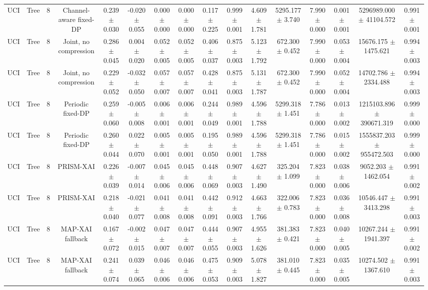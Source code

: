 \begin{tabular}{lccccccccccccccc}
UCI & Tree & 8 & Channel-aware fixed-DP & 0.239 $\pm$ 0.030 & -0.020 $\pm$ 0.055 & 0.000 $\pm$ 0.000 & 0.000 $\pm$ 0.000 & 0.117 $\pm$ 0.225 & 0.999 $\pm$ 0.001 & 4.609 $\pm$ 1.781 & 5295.177 $\pm$ 3.740 & 7.990 $\pm$ 0.000 & 0.001 $\pm$ 0.001 & 5296989.000 $\pm$ 41104.572 & 0.991 $\pm$ 0.001 \\
UCI & Tree & 8 & Joint, no compression & 0.286 $\pm$ 0.045 & 0.004 $\pm$ 0.020 & 0.052 $\pm$ 0.005 & 0.052 $\pm$ 0.005 & 0.406 $\pm$ 0.037 & 0.875 $\pm$ 0.003 & 5.123 $\pm$ 1.792 & 672.300 $\pm$ 0.452 & 7.990 $\pm$ 0.000 & 0.053 $\pm$ 0.004 & 15676.175 $\pm$ 1475.621 & 0.994 $\pm$ 0.003 \\
UCI & Tree & 8 & Joint, no compression & 0.229 $\pm$ 0.052 & -0.032 $\pm$ 0.050 & 0.057 $\pm$ 0.007 & 0.057 $\pm$ 0.007 & 0.428 $\pm$ 0.041 & 0.875 $\pm$ 0.003 & 5.131 $\pm$ 1.787 & 672.300 $\pm$ 0.452 & 7.990 $\pm$ 0.000 & 0.052 $\pm$ 0.004 & 14702.786 $\pm$ 2334.488 & 0.994 $\pm$ 0.003 \\
UCI & Tree & 8 & Periodic fixed-DP & 0.259 $\pm$ 0.060 & -0.005 $\pm$ 0.008 & 0.006 $\pm$ 0.001 & 0.006 $\pm$ 0.001 & 0.244 $\pm$ 0.049 & 0.989 $\pm$ 0.001 & 4.596 $\pm$ 1.788 & 5299.318 $\pm$ 1.451 & 7.786 $\pm$ 0.000 & 0.013 $\pm$ 0.002 & 1215103.896 $\pm$ 390671.319 & 0.999 $\pm$ 0.000 \\
UCI & Tree & 8 & Periodic fixed-DP & 0.260 $\pm$ 0.044 & 0.022 $\pm$ 0.070 & 0.005 $\pm$ 0.001 & 0.005 $\pm$ 0.001 & 0.195 $\pm$ 0.050 & 0.989 $\pm$ 0.001 & 4.596 $\pm$ 1.788 & 5299.318 $\pm$ 1.451 & 7.786 $\pm$ 0.000 & 0.015 $\pm$ 0.002 & 1555837.203 $\pm$ 955472.503 & 0.999 $\pm$ 0.000 \\
UCI & Tree & 8 & PRISM-XAI & 0.226 $\pm$ 0.039 & -0.007 $\pm$ 0.014 & 0.045 $\pm$ 0.006 & 0.045 $\pm$ 0.006 & 0.448 $\pm$ 0.069 & 0.907 $\pm$ 0.003 & 4.627 $\pm$ 1.490 & 325.204 $\pm$ 1.099 & 7.823 $\pm$ 0.000 & 0.038 $\pm$ 0.006 & 9052.203 $\pm$ 1462.054 & 0.991 $\pm$ 0.002 \\
UCI & Tree & 8 & PRISM-XAI & 0.218 $\pm$ 0.040 & -0.021 $\pm$ 0.077 & 0.041 $\pm$ 0.008 & 0.041 $\pm$ 0.008 & 0.442 $\pm$ 0.091 & 0.912 $\pm$ 0.003 & 4.663 $\pm$ 1.766 & 322.006 $\pm$ 0.783 & 7.823 $\pm$ 0.000 & 0.036 $\pm$ 0.008 & 10546.447 $\pm$ 3413.298 & 0.991 $\pm$ 0.003 \\
UCI & Tree & 8 & MAP-XAI fallback & 0.167 $\pm$ 0.072 & -0.002 $\pm$ 0.015 & 0.047 $\pm$ 0.007 & 0.047 $\pm$ 0.007 & 0.444 $\pm$ 0.055 & 0.907 $\pm$ 0.003 & 4.955 $\pm$ 1.626 & 381.383 $\pm$ 0.421 & 7.823 $\pm$ 0.000 & 0.040 $\pm$ 0.005 & 10267.244 $\pm$ 1941.397 & 0.991 $\pm$ 0.002 \\
UCI & Tree & 8 & MAP-XAI fallback & 0.241 $\pm$ 0.074 & 0.039 $\pm$ 0.065 & 0.046 $\pm$ 0.006 & 0.046 $\pm$ 0.006 & 0.475 $\pm$ 0.053 & 0.909 $\pm$ 0.003 & 5.078 $\pm$ 1.827 & 381.010 $\pm$ 0.445 & 7.823 $\pm$ 0.000 & 0.035 $\pm$ 0.005 & 10274.502 $\pm$ 1367.610 & 0.991 $\pm$ 0.003 \\
\bottomrule
\end{tabular}
